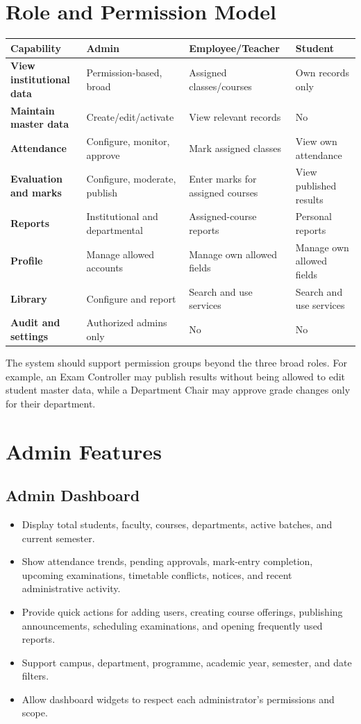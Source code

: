 \documentclass[10pt,a4paper]{article}
\begin{document}
\section{Role and Permission Model}

\begin{tabularx}{\textwidth}{>{\bfseries}p{3.0cm} X X X}
\toprule
Capability & Admin & Employee/Teacher & Student \\
\midrule
View institutional data & Permission-based, broad & Assigned classes/courses & Own records only \\
Maintain master data & Create/edit/activate & View relevant records & No \\
Attendance & Configure, monitor, approve & Mark assigned classes & View own attendance \\
Evaluation and marks & Configure, moderate, publish & Enter marks for assigned courses & View published results \\
Reports & Institutional and departmental & Assigned-course reports & Personal reports \\
Profile & Manage allowed accounts & Manage own allowed fields & Manage own allowed fields \\
Library & Configure and report & Search and use services & Search and use services \\
Audit and settings & Authorized admins only & No & No \\
\bottomrule
\end{tabularx}

The system should support permission groups beyond the three broad roles. For
example, an Exam Controller may publish results without being allowed to edit
student master data, while a Department Chair may approve grade changes only
for their department.

\newpage
\section{Admin Features}

\subsection{Admin Dashboard}
\begin{itemize}
  \item Display total students, faculty, courses, departments, active batches, and current semester.
  \item Show attendance trends, pending approvals, mark-entry completion, upcoming examinations,
        timetable conflicts, notices, and recent administrative activity.
  \item Provide quick actions for adding users, creating course offerings, publishing announcements,
        scheduling examinations, and opening frequently used reports.
  \item Support campus, department, programme, academic year, semester, and date filters.
  \item Allow dashboard widgets to respect each administrator's permissions and scope.
\end{itemize}
\end{document}
